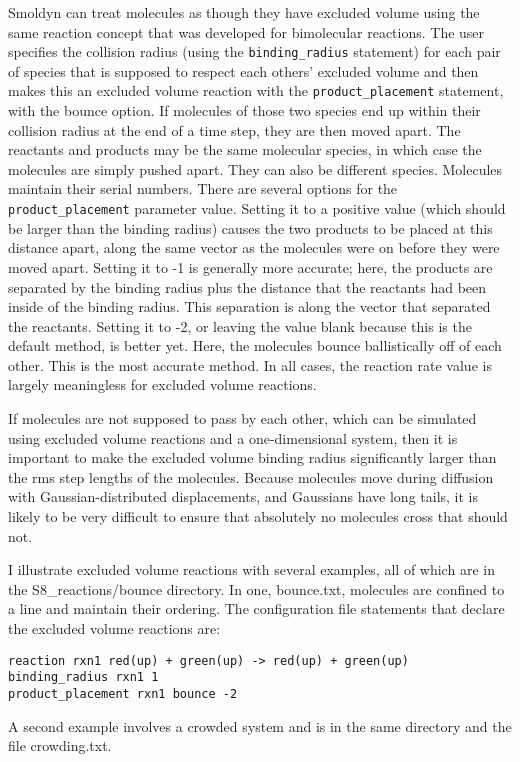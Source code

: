 \documentclass {scrbook}
\newcommand {\ttt} {\texttt}
\begin{document}
Smoldyn can treat molecules as though they have excluded volume using the same reaction concept that was developed for bimolecular reactions. The user specifies the collision radius (using the \ttt{binding\_radius} statement) for each pair of species that is supposed to respect each others' excluded volume and then makes this an excluded volume reaction with the \ttt{product\_placement} statement, with the bounce option. If molecules of those two species end up within their collision radius at the end of a time step, they are then moved apart. The reactants and products may be the same molecular species, in which case the molecules are simply pushed apart. They can also be different species. Molecules maintain their serial numbers. There are several options for the \ttt{product\_placement} parameter value. Setting it to a positive value (which should be larger than the binding radius) causes the two products to be placed at this distance apart, along the same vector as the molecules were on before they were moved apart. Setting it to -1 is generally more accurate; here, the products are separated by the binding radius plus the distance that the reactants had been inside of the binding radius. This separation is along the vector that separated the reactants. Setting it to -2, or leaving the value blank because this is the default method, is better yet. Here, the molecules bounce ballistically off of each other. This is the most accurate method. In all cases, the reaction rate value is largely meaningless for excluded volume reactions.

If molecules are not supposed to pass by each other, which can be simulated using excluded volume reactions and a one-dimensional system, then it is important to make the excluded volume binding radius significantly larger than the rms step lengths of the molecules. Because molecules move during diffusion with Gaussian-distributed displacements, and Gaussians have long tails, it is likely to be very difficult to ensure that absolutely no molecules cross that should not.

I illustrate excluded volume reactions with several examples, all of which are in the S8\_reactions/bounce directory. In one, bounce.txt, molecules are confined to a line and maintain their ordering. The configuration file statements that declare the excluded volume reactions are:
\begin{lstlisting}[style=SSAC]
reaction rxn1 red(up) + green(up) -> red(up) + green(up)
binding_radius rxn1 1
product_placement rxn1 bounce -2
\end{lstlisting}
A second example involves a crowded system and is in the same directory and the file crowding.txt.
\end{document}
